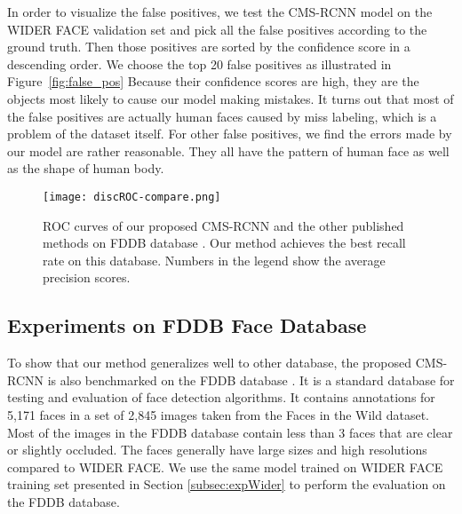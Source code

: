 \documentclass[10pt,journal,cspaper,compsoc]{IEEEtran}
\begin{document}
In order to visualize the false positives, we test the CMS-RCNN model on the WIDER FACE validation set and pick all the false positives according to the ground truth. Then those positives are sorted by the confidence score in a descending order. We choose the top 20 false positives as illustrated in Figure~\ref{fig:false_pos} Because their confidence scores are high, they are the objects most likely to cause our model making mistakes. It turns out that most of the false positives are actually human faces caused by miss labeling, which is a problem of the dataset itself. For other false positives, we find the errors made by our model are rather reasonable. They all have the pattern of human face as well as the shape of human body.







\begin{figure*}[ht]
\centering 
\texttt{[image: discROC-compare.png]}
\caption{ROC curves of our proposed CMS-RCNN and the other published methods on FDDB database \cite{fddbTech}. Our method achieves the best recall rate on this database. Numbers in the legend show the average precision scores.}
\label{fig:roc_fdd2}
\end{figure*}

\subsection{Experiments on FDDB Face Database}
\label{subsec:fddbface}
To show that our method generalizes well to other database, the proposed CMS-RCNN is also benchmarked on the FDDB database \cite{fddbTech}. It is a standard database for testing and evaluation of face detection algorithms. It contains annotations for 5,171 faces in a set of 2,845 images taken from the Faces in the Wild dataset. Most of the images in the FDDB database contain less than 3 faces that are clear or slightly occluded. The faces generally have large sizes and high resolutions compared to WIDER FACE.
We use the same model trained on WIDER FACE training set presented in Section \ref{subsec:expWider} to perform the evaluation on the FDDB database.
\end{document}
